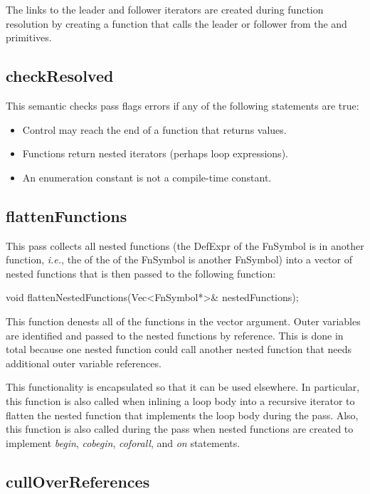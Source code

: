 \documentclass[10pt]{article}
\newcommand{\ie}{\emph{i.e.}}
\begin{document}
The links to the leader and follower iterators are created during
function resolution by creating a function that calls the leader or
follower from the  and  primitives.

\subsection{checkResolved}

This semantic checks pass flags errors if any of the following
statements are true:
\begin{itemize}
\item Control may reach the end of a function that returns values.
\item Functions return nested iterators (perhaps loop expressions).
\item An enumeration constant is not a compile-time constant.
\end{itemize}

\subsection{flattenFunctions}

This pass collects all nested functions (the DefExpr of the FnSymbol
is in another function, \ie, the  of the
 of the FnSymbol is another FnSymbol) into a vector of
nested functions that is then passed to the following function:

\begin{clang}
void flattenNestedFunctions(Vec<FnSymbol*>& nestedFunctions);
\end{clang}

This function denests all of the functions in the vector argument.
Outer variables are identified and passed to the nested functions by
reference.  This is done in total because one nested function could
call another nested function that needs additional outer variable
references.

This functionality is encapsulated so that it can be used elsewhere.
In particular, this function is also called when inlining a loop body
into a recursive iterator to flatten the nested function that
implements the loop body during the  pass.  Also,
this function is also called during the  pass when nested
functions are created to implement \emph{begin}, \emph{cobegin},
\emph{coforall}, and \emph{on} statements.

\subsection{cullOverReferences}
\end{document}
